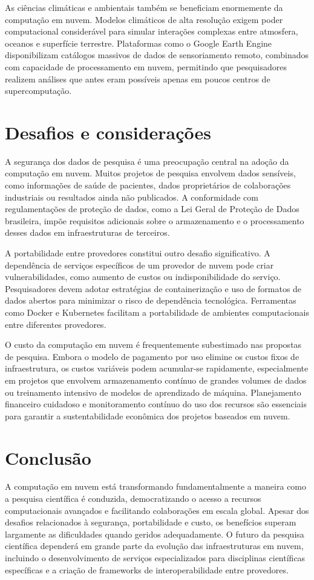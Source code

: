\documentclass[
    language=portuguese,
    doctype=article,
]{../../omnilatex}
\begin{document}
As ciências climáticas e ambientais também se beneficiam enormemente da computação em nuvem. Modelos climáticos de alta resolução exigem poder computacional considerável para simular interações complexas entre atmosfera, oceanos e superfície terrestre. Plataformas como o Google Earth Engine disponibilizam catálogos massivos de dados de sensoriamento remoto, combinados com capacidade de processamento em nuvem, permitindo que pesquisadores realizem análises que antes eram possíveis apenas em poucos centros de supercomputação.

\section{Desafios e considerações}
A segurança dos dados de pesquisa é uma preocupação central na adoção da computação em nuvem. Muitos projetos de pesquisa envolvem dados sensíveis, como informações de saúde de pacientes, dados proprietários de colaborações industriais ou resultados ainda não publicados. A conformidade com regulamentações de proteção de dados, como a Lei Geral de Proteção de Dados brasileira, impõe requisitos adicionais sobre o armazenamento e o processamento desses dados em infraestruturas de terceiros.

A portabilidade entre provedores constitui outro desafio significativo. A dependência de serviços específicos de um provedor de nuvem pode criar vulnerabilidades, como aumento de custos ou indisponibilidade do serviço. Pesquisadores devem adotar estratégias de containerização e uso de formatos de dados abertos para minimizar o risco de dependência tecnológica. Ferramentas como Docker e Kubernetes facilitam a portabilidade de ambientes computacionais entre diferentes provedores.

O custo da computação em nuvem é frequentemente subestimado nas propostas de pesquisa. Embora o modelo de pagamento por uso elimine os custos fixos de infraestrutura, os custos variáveis podem acumular-se rapidamente, especialmente em projetos que envolvem armazenamento contínuo de grandes volumes de dados ou treinamento intensivo de modelos de aprendizado de máquina. Planejamento financeiro cuidadoso e monitoramento contínuo do uso dos recursos são essenciais para garantir a sustentabilidade econômica dos projetos baseados em nuvem.

\section{Conclusão}
A computação em nuvem está transformando fundamentalmente a maneira como a pesquisa científica é conduzida, democratizando o acesso a recursos computacionais avançados e facilitando colaborações em escala global. Apesar dos desafios relacionados à segurança, portabilidade e custo, os benefícios superam largamente as dificuldades quando geridos adequadamente. O futuro da pesquisa científica dependerá em grande parte da evolução das infraestruturas em nuvem, incluindo o desenvolvimento de serviços especializados para disciplinas científicas específicas e a criação de frameworks de interoperabilidade entre provedores.
\end{document}
